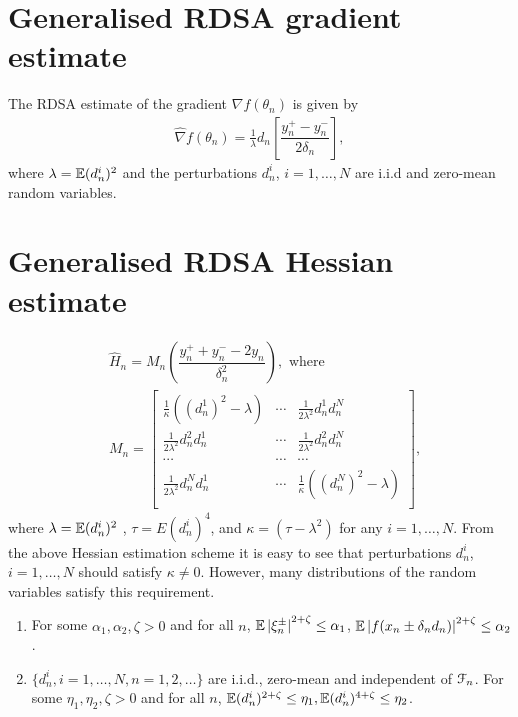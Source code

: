 \section{Generalised RDSA gradient estimate}
The RDSA estimate of the gradient $\nabla f(\theta_n)$ is given by
\begin{align}
\label{eq:grad-gen}
\widehat\nabla f(\theta_n) = \frac1{\lambda} d_n \left[ \dfrac{y_n^+ - y_n^-}{2\delta_n}\right],
\end{align}
where $\lambda = \mathbb{E}(d_n^i)^2 $ and the perturbations $d_n^i$, $i=1,\ldots,N$ are i.i.d and zero-mean random variables. 

\section{Generalised RDSA Hessian estimate}
\begin{align}
\label{eq:2rdsa-estimate-gen}
&\widehat H_n = M_n \left(\dfrac{y_n^+ + y_n^- - 2 y_n}{\delta_n^2}\right), \text{ where }\\
& M_n =
\left[
\begin{array}{ccc}
\frac{1}{\kappa}\left((d_n^1)^2\!-\lambda\right) & \cdots & \frac{1}{2 \lambda^2}d_n^1 d_n^N\\
\frac{1}{2 \lambda^2}d_n^2 d_n^1  &  \cdots & \frac{1}{2 \lambda^2}d_n^2 d_n^N\\
\cdots&\cdots&\cdots\\
\frac{1}{2 \lambda^2}d_n^N d_n^1 & \cdots &  \frac{1}{\kappa}\left((d_n^N)^2-\lambda\right) \\
\end{array}
\right],\nonumber
\end{align}
where $\lambda = \mathbb{E}(d_n^i)^2 $ , $\tau = E (d_n^i)^4$, and $\kappa = \left(\tau - \lambda^2\right)$ for any $i=1,\ldots,N$.
From the above Hessian estimation scheme it is easy to see that perturbations $d_n^i$, $i=1,\ldots,N$ should satisfy  $\kappa \neq 0$. However, many distributions of the random variables satisfy this requirement. 


\begin{enumerate}[label=(\textbf{A\arabic*}),resume]
\item For some $\alpha_1, \alpha_2,\zeta >0$ and for all $n$, 
$\mathbb{E} \left|\xi_n^{\pm}\right|^{2+\zeta} \le \alpha_1$, $\mathbb{E} \left|f(x_n\pm \delta_n d_n)\right|^{2+\zeta} \le \alpha_2$. 
\item $\{d_n^i, i=1,\ldots,N, n=1,2,\ldots\}$ are i.i.d., zero-mean and independent of $\mathcal{F}_n$. For some $\eta_1,\eta_2,\zeta >0$ and for all $n$, $\mathbb{E}(d_n^i)^{2+\zeta} \le \eta_1,\mathbb{E}(d_n^i)^{4+\zeta} \le \eta_2$.
\end{enumerate}


